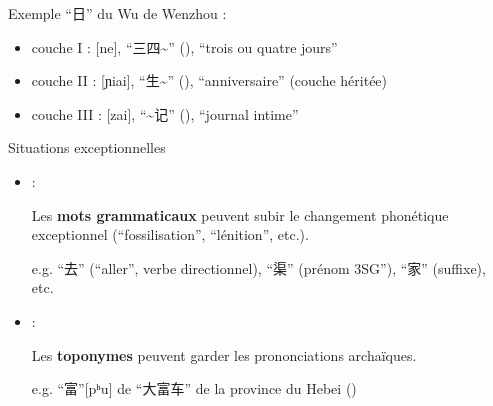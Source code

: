 \documentclass[11pt]{beamer}
\begin{document}
\begin{frame}{Exemple}
``日'' du Wu de Wenzhou :
\begin{itemize}
\item{couche I : [ne], ``三四\textasciitilde'' (\cite[158]{You1998Wenzhou}), ``trois ou quatre jours''}

\item{couche II : [ɲiai], ``生\textasciitilde'' (\cite[1471]{You1998Wenzhou}), ``anniversaire'' (couche héritée)}

\item{couche III : [zai], ``\textasciitilde 记'' (\cite[54]{Pan1998wenzhou}), ``journal intime''}
\end{itemize}
\end{frame}

\begin{frame}{Situations exceptionnelles}
\begin{itemize}
\item{\textcite{Cao2022tangxi} :

Les \textbf{mots grammaticaux} peuvent subir le changement phonétique exceptionnel (``fossilisation'', ``lénition'', etc.).

\begin{small}
e.g. ``去'' (``aller'', verbe directionnel), ``渠'' (prénom 3SG''), ``家'' (suffixe), etc.
\end{small}
}

\item{\textcite{Li1985diming} :

Les \textbf{toponymes} peuvent garder les prononciations archaïques.

\begin{small}
e.g. ``富''[pʰu] de ``大富车'' de la province du Hebei (\cite[36--37]{Wang2017diming_yixian})
\end{small}
}
\end{itemize}
\end{frame}
\end{document}
